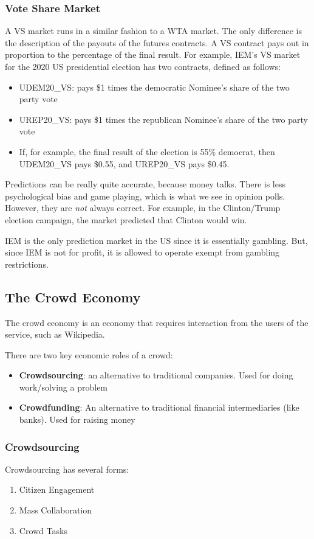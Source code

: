 \documentclass[11pt,a4paper,titlepage,dvipsnames,cmyk]{scrartcl}
\begin{document}
\subsubsection{Vote Share Market}
A VS market runs in a similar fashion to a WTA market. The only difference is the description of the payouts of the futures contracts. A VS contract pays out in proportion to the percentage of the final result. For example, IEM's VS market for the 2020 US presidential election has two contracts, defined as follows:
\begin{itemize}
    \item UDEM20\_VS: pays \$1 times the democratic Nominee's share of the two party vote
    \item UREP20\_VS: pays \$1 times the republican Nominee's share of the two party vote
    \item If, for example, the final result of the election is 55\% democrat, then UDEM20\_VS pays \$0.55, and UREP20\_VS pays \$0.45.
\end{itemize}

Predictions can be really quite accurate, because money talks. There is less psychological bias and game playing, which is what we see in opinion polls. However, they are \textit{not} always correct. For example, in the Clinton/Trump election campaign, the market predicted that Clinton would win.

IEM is the only prediction market in the US since it is essentially gambling. But, since IEM is not for profit, it is allowed to operate exempt from gambling restrictions.

\subsection{The Crowd Economy}
The crowd economy is an economy that requires interaction from the users of the service, such as Wikipedia.

There are two key economic roles of a crowd:
\begin{itemize}
    \item \textbf{Crowdsourcing}: an alternative to traditional companies. Used for doing work/solving a problem
    \item \textbf{Crowdfunding}: An alternative to traditional financial intermediaries (like banks). Used for raising money
\end{itemize}
\subsubsection{Crowdsourcing}
Crowdsourcing has several forms:
\begin{enumerate}
\item Citizen Engagement
\item Mass Collaboration
\item Crowd Tasks
\end{enumerate}
\end{document}
